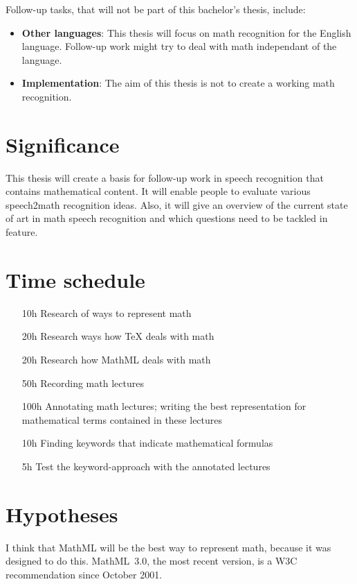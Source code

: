 \documentclass[a4paper]{scrartcl}
\begin{document}
    Follow-up tasks, that will not be part of this bachelor's thesis,
    include:
    \begin{itemize}
        \item \textbf{Other languages}: This thesis will focus on math
            recognition for the English language. Follow-up work might
            try to deal with math independant of the language.
        \item \textbf{Implementation}: The aim of this thesis is not
            to create a working math recognition.
    \end{itemize}

\section{Significance}
This thesis will create a basis for follow-up work in speech recognition
that contains mathematical content. It will enable people to evaluate
various speech2math recognition ideas. Also, it will give an overview
of the current state of art in math speech recognition and which
questions need to be tackled in feature.

\section{Time schedule}
\begin{itemize}
    \item[10h] Research of ways to represent math
    \item[20h] Research ways how \TeX{} deals with math
    \item[20h] Research how MathML deals with math
    \item[50h] Recording math lectures
    \item[100h] Annotating math lectures; writing the best
                representation for mathematical terms contained in
                these lectures
    \item[10h] Finding keywords that indicate mathematical formulas
    \item[5h] Test the keyword-approach with the annotated lectures
\end{itemize}

\renewcommand\refname{Related Literature}
\nocite{*}



\section{Hypotheses}
I think that MathML will be the best way to represent math, because
it was designed to do this. MathML~3.0, the most recent version,
is a W3C recommendation since October 2001.
\end{document}
